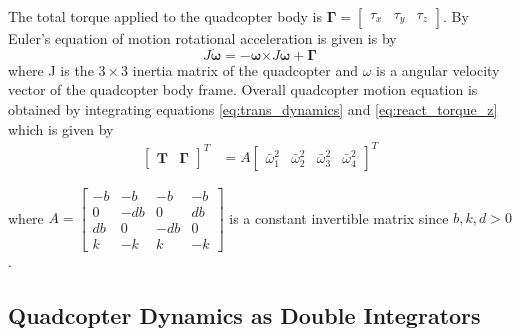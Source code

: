 \documentclass[letterpaper, 10 pt, conference]{ieeeconf}
\begin{document}
The total torque applied to the quadcopter body is  $ \mathbf{\Gamma} =\begin{bmatrix}  {\tau}_{x} & {\tau}_{y} & {\tau}_{z} \end{bmatrix}$. By Euler's equation of motion rotational acceleration is given is by
\begin{equation}
    J\boldsymbol{\Dot{\omega}}=-\boldsymbol{\omega} \boldsymbol{\times}J \boldsymbol{\omega}+\mathbf{\Gamma}
\end{equation}
where J is the $3\times3$ inertia matrix of the quadcopter and $\omega$ is a angular velocity vector of the quadcopter body frame.
Overall quadcopter motion equation \cite{Robotics_Vision_Control} is obtained by integrating equations \eqref{eq:trans_dynamics} and \eqref{eq:react_torque_z} which is given by
\begin{align}
    \begin{bmatrix}
        \mathbf{T} &
        \mathbf{\Gamma}
    \end{bmatrix}^T & =A\begin{bmatrix}
        \bar{\omega}_{1}^{2} &
        \bar{\omega}_{2}^{2} &
        \bar{\omega}_{3}^{2} &
        \bar{\omega}_{4}^{2}
    \end{bmatrix}^T
\end{align}

\noindent where $A =\begin{bmatrix}
        -b  & -b   & -b   & -b  \\
        0   & -d b & 0    & d b \\
        d b & 0    & -d b & 0   \\
        k   & -k   & k    & -k
    \end{bmatrix}$ is a constant invertible matrix since $b,k,d > 0$.

\subsection{Quadcopter Dynamics as Double Integrators}\label{subsec:di}
\end{document}
